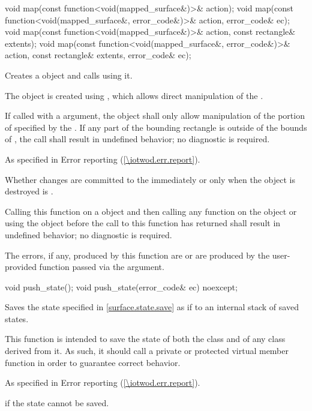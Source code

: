 \begin{itemdecl}
void map(const function<void(mapped_surface&)>& action);
void map(const function<void(mapped_surface&, error_code&)>& action, error_code& ec);
void map(const function<void(mapped_surface&)>& action, const rectangle& extents);
void map(const function<void(mapped_surface&, error_code&)>& action,
  const rectangle& extents, error_code& ec);
\end{itemdecl}
\begin{itemdescr}
\pnum
\effects
Creates a  object and calls  using it.

\pnum
The  object is created using , which allows direct manipulation of the \underlyingsurface.

\pnum
If called with a  argument, the  object shall only allow manipulation of the portion of  specified by the  . If any part of the bounding rectangle is outside of the bounds of , the call shall result in undefined behavior; no diagnostic is required.

\pnum
\throws
As specified in Error reporting (\ref{\iotwod.err.report}).

\pnum
\remarks
Whether changes are committed to the \underlyingsurface immediately or only when the  object is destroyed is \unspecnorm.

\pnum
Calling this function on a  object and then calling any function on the  object or using the  object before the call to this function has returned shall result in undefined behavior; no diagnostic is required.

\pnum
\errors
The errors, if any, produced by this function are  or are produced by the user-provided function passed via the  argument.
\end{itemdescr}

\begin{itemdecl}
void push_state();
void push_state(error_code& ec) noexcept;
\end{itemdecl}
\begin{itemdescr}
\pnum
\effects
Saves the state specified in \ref{surface.state.save} as if to an internal stack of saved states.

\pnum
\remarks
This function is intended to save the state of both the  class and of any class derived from it. As such, it should call a private or protected virtual member function in order to guarantee correct behavior.

\pnum
\throws
As specified in Error reporting (\ref{\iotwod.err.report}).

\pnum
\errors
{} if the state cannot be saved.
\end{itemdescr}

